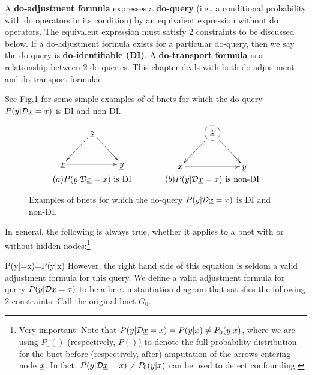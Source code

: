 A {\bf do-adjustment 
formula} expresses
a {\bf do-query} (i.e., 
a conditional probability
with do operators
in its condition) by
an equivalent expression
without do operators.
The equivalent expression must 
satisfy 2 constraints
to be discussed  below.
If a do-adjustment formula
exists for a
particular do-query, 
then we say the do-query is
 {\bf do-identifiable (DI)}.
A {\bf do-transport formula}
is a relationship between 2  do-queries.
This chapter deals with both
do-adjustment and do-transport
formulae.

See Fig.\ref{fig-iden-noniden}
for some simple
examples of of 
bnets for which
the do-query $P(y|{\cal D}{\underline{x}}=x)$
is
DI
and non-DI.

\begin{figure}[h!]
$$
\begin{array}{ccc}
\xymatrix{
&\rvz\ar[ld]\ar[rd]
\\
\rvx\ar[rr]&&\rvy
}
&\quad\quad&
\xymatrix{
&*++[F-o]{\rvz}\ar[ld]\ar[rd]
\\
\rvx\ar[rr]&&\rvy
}
\\
(a) \text{$P(y|\cald\rvx=x)$ is DI}
&&(b) \text{$P(y|\cald\rvx=x)$ is non-DI}
\end{array}
$$
\caption{Examples of 
bnets for which
the do-query $P(y|{\cal D}{\underline{x}}=x)$
is
DI
and non-DI.
}
\label{fig-iden-noniden}
\end{figure}

In general, the
following is always true,
whether it applies to a bnet
with or without hidden nodes:\footnote{Very important: Note that $P(y|{\cal D}{\underline{x}}=x)=P(y|x)\neq P_0(y|x)$, where
we are using $P_0()$ (respectively, $P()$)
to denote the full probability distribution
for the bnet before (respectively, after) amputation
of the arrows entering node ${\underline{x}}$.
In fact, $P(y|{\cal D}{\underline{x}}=x)\neq P_0(y|x)$
can be used to detect confounding.
}

\beq
P(y|\cald\rvx=x)=P(y|x)
\;
\eeq
However, the right hand side of this equation is 
seldom a valid adjustment formula
for this query.
We define a valid adjustment formula
for query
$P(y|{\cal D}{\underline{x}}=x)$
to be a bnet instantiation diagram
that satisfies the
following 2 constraints:
Call the original bnet $G_0$.

